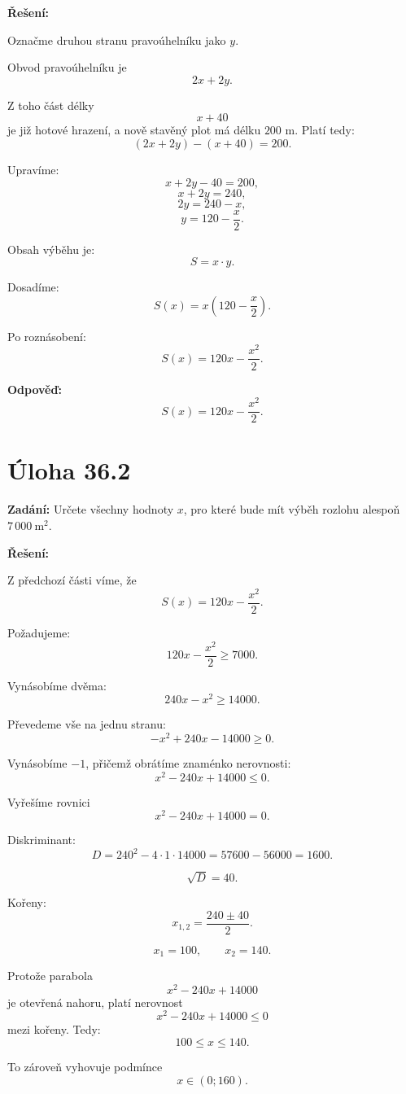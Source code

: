 \documentclass[12pt,a4paper]{article}
\begin{document}
\bigskip

\textbf{Řešení:}

Označme druhou stranu pravoúhelníku jako \(y\).

Obvod pravoúhelníku je
\[
2x+2y.
\]

Z toho část délky
\[
x+40
\]
je již hotové hrazení, a nově stavěný plot má délku \(200\) m. Platí tedy:
\[
(2x+2y)-(x+40)=200.
\]

Upravíme:
\[
x+2y-40=200,
\]
\[
x+2y=240,
\]
\[
2y=240-x,
\]
\[
y=120-\frac{x}{2}.
\]

Obsah výběhu je:
\[
S=x\cdot y.
\]

Dosadíme:
\[
S(x)=x\left(120-\frac{x}{2}\right).
\]

Po roznásobení:
\[
S(x)=120x-\frac{x^2}{2}.
\]

\bigskip

\textbf{Odpověď:}  
\[
S(x)=120x-\frac{x^2}{2}.
\]

\section*{Úloha 36.2}

\textbf{Zadání:}  
Určete všechny hodnoty \(x\), pro které bude mít výběh rozlohu alespoň \(7\,000\ \mathrm{m}^2\).

\bigskip

\textbf{Řešení:}

Z předchozí části víme, že
\[
S(x)=120x-\frac{x^2}{2}.
\]

Požadujeme:
\[
120x-\frac{x^2}{2}\ge 7000.
\]

Vynásobíme dvěma:
\[
240x-x^2\ge 14000.
\]

Převedeme vše na jednu stranu:
\[
-x^2+240x-14000\ge 0.
\]

Vynásobíme \(-1\), přičemž obrátíme znaménko nerovnosti:
\[
x^2-240x+14000\le 0.
\]

Vyřešíme rovnici
\[
x^2-240x+14000=0.
\]

Diskriminant:
\[
D=240^2-4\cdot 1\cdot 14000=57600-56000=1600.
\]

\[
\sqrt{D}=40.
\]

Kořeny:
\[
x_{1,2}=\frac{240\pm 40}{2}.
\]

\[
x_1=100,\qquad x_2=140.
\]

Protože parabola
\[
x^2-240x+14000
\]
je otevřená nahoru, platí nerovnost
\[
x^2-240x+14000\le 0
\]
mezi kořeny. Tedy:
\[
100\le x\le 140.
\]

To zároveň vyhovuje podmínce
\[
x\in(0;160).
\]
\end{document}
